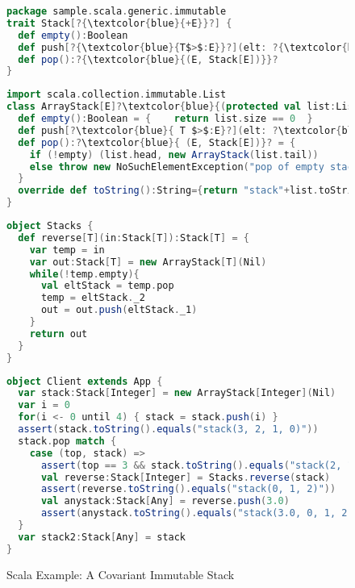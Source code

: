   \begin{figure}[p]
  \begin{lstlisting}[language=scala, escapechar=?]
package sample.scala.generic.immutable  
trait Stack[?{\textcolor{blue}{+E}}?] {
  def empty():Boolean
  def push[?{\textcolor{blue}{T$>$:E}}?](elt: ?{\textcolor{blue}{T}}?): ?\textcolor{blue}{Stack[T]}?
  def pop():?{\textcolor{blue}{(E, Stack[E])}}?
}
  \end{lstlisting}

  \begin{lstlisting}[language=scala, escapechar=?]
import scala.collection.immutable.List
class ArrayStack[E]?\textcolor{blue}{(protected val list:List[E])}? extends Stack[E]{  
  def empty():Boolean = {    return list.size == 0  }
  def push[?\textcolor{blue}{ T $>$:E}?](elt: ?\textcolor{blue}{ T}?): ?\textcolor{blue}{ Stack[T]}? = {  new ArrayStack(elt :: list)  }
  def pop():?\textcolor{blue}{ (E, Stack[E])}? = {
    if (!empty) (list.head, new ArrayStack(list.tail))
    else throw new NoSuchElementException("pop of empty stack")
  }
  override def toString():String={return "stack"+list.toString.drop(4)}
}
  \end{lstlisting}
  
  \begin{lstlisting}[language=scala]
object Stacks {
  def reverse[T](in:Stack[T]):Stack[T] = {
    var temp = in
    var out:Stack[T] = new ArrayStack[T](Nil)
    while(!temp.empty){
      val eltStack = temp.pop
      temp = eltStack._2
      out = out.push(eltStack._1)
    }
    return out
  }
}
  \end{lstlisting}

  \begin{lstlisting}[language=scala, escapechar=?]
object Client extends App {
  var stack:Stack[Integer] = new ArrayStack[Integer](Nil)  
  var i = 0
  for(i <- 0 until 4) { stack = stack.push(i) }
  assert(stack.toString().equals("stack(3, 2, 1, 0)"))
  stack.pop match {
    case (top, stack) =>
      assert(top == 3 && stack.toString().equals("stack(2, 1, 0)"))
      val reverse:Stack[Integer] = Stacks.reverse(stack)
      assert(reverse.toString().equals("stack(0, 1, 2)"))      
      val anystack:Stack[Any] = reverse.push(3.0)
      assert(anystack.toString().equals("stack(3.0, 0, 1, 2)"))      
  }
  var stack2:Stack[Any] = stack  
}
  \end{lstlisting} 
  \caption{Scala Example: A Covariant Immutable Stack}
  \label{scala_covariance}
\end{figure}


